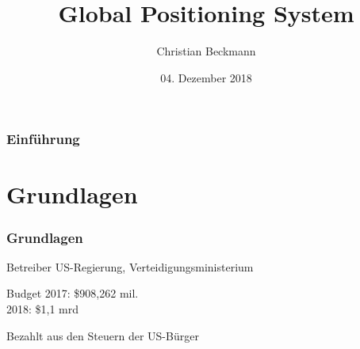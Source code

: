 
\title{Global Positioning System}
\author[C.~Beckmann]{Christian Beckmann}
\date{04. Dezember 2018}


    \maketitle
    \begin{frame}
        \frametitle{Einführung}
        \tableofcontents%
    \end{frame}
    \section{Grundlagen}
    \begin{frame}
	       \frametitle{Grundlagen}
           \begin{block}{Betreiber}
               US-Regierung, Verteidigungsministerium
           \end{block}
           \begin{block}{Budget}
               2017: \$908,262 mil.\\
               2018: \$1,1 mrd
           \end{block}
           Bezahlt aus den Steuern der US-Bürger
           \cite{gpsgov}
       \end{frame}

